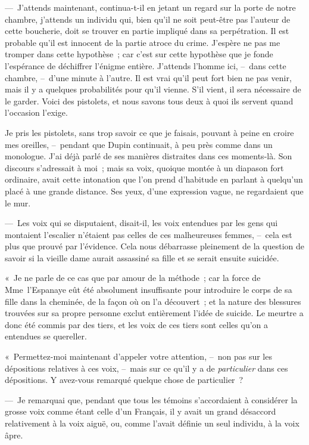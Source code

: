 \documentclass[french,twoside]{book} %
\begin{document}
— J’attends maintenant, continua-t-il en jetant un regard sur la porte de notre chambre, j’attends un individu qui, bien qu’il ne soit peut-être pas l’auteur de cette boucherie, doit se trouver en partie impliqué dans sa perpétration. Il est probable qu’il est innocent de la partie atroce du crime. J’espère ne pas me tromper dans cette hypothèse ; car c’est sur cette hypothèse que je fonde l’espérance de déchiffrer l’énigme entière. J’attends l’homme ici, – dans cette chambre, – d’une minute à l’autre. Il est vrai qu’il peut fort bien ne pas venir, mais il y a quelques probabilités pour qu’il vienne. S’il vient, il sera nécessaire de le garder. Voici des pistolets, et nous savons tous deux à quoi ils servent quand l’occasion l’exige.\par
Je pris les pistolets, sans trop savoir ce que je faisais, pouvant à peine en croire mes oreilles, – pendant que Dupin continuait, à peu près comme dans un monologue. J’ai déjà parlé de ses manières distraites dans ces moments-là. Son discours s’adressait à moi ; mais sa voix, quoique montée à un diapason fort ordinaire, avait cette intonation que l’on prend d’habitude en parlant à quelqu’un placé à une grande distance. Ses yeux, d’une expression vague, ne regardaient que le mur.\par
— Les voix qui se disputaient, disait-il, les voix entendues par les gens qui montaient l’escalier n’étaient pas celles de ces malheureuses femmes, – cela est plus que prouvé par l’évidence. Cela nous débarrasse pleinement de la question de savoir si la vieille dame aurait assassiné sa fille et se serait ensuite suicidée.\par
« Je ne parle de ce cas que par amour de la méthode ; car la force de Mme l’Espanaye eût été absolument insuffisante pour introduire le corps de sa fille dans la cheminée, de la façon où on l’a découvert ; et la nature des blessures trouvées sur sa propre personne exclut entièrement l’idée de suicide. Le meurtre a donc été commis par des tiers, et les voix de ces tiers sont celles qu’on a entendues se quereller.\par
« Permettez-moi maintenant d’appeler votre attention, – non pas sur les dépositions relatives à ces voix, – mais sur ce qu’il y a de \emph{particulier} dans ces dépositions. Y avez-vous remarqué quelque chose de particulier ?\par
— Je remarquai que, pendant que tous les témoins s’accordaient à considérer la grosse voix comme étant celle d’un Français, il y avait un grand désaccord relativement à la voix aiguë, ou, comme l’avait définie un seul individu, à la voix âpre.\par
\end{document}
